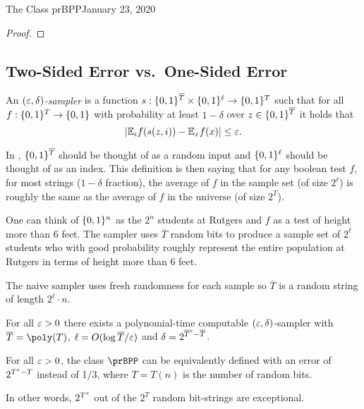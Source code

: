 \begin{lecture}{1}{The Class prBPP}{January 23, 2020}
\begin{proof}
	
\end{proof}

\subsection{Two-Sided Error vs.\ One-Sided Error}


\begin{definition}\label{def:sampler}
  An \emph{$(\varepsilon, \delta)$-sampler} is a function $s :
  \{0,1\}^{\overline{T}} \times \{0,1\}^\ell \to \{0,1\}^T$ such that for
  all $f : \{0,1\}^T \to \{0,1\}$ with probability at least $1 - \delta$ 
  over $z \in \{0,1\}^{\overline{T}}$ it holds that \[
    |\mathbb{E}_i f(s(z, i)) - \mathbb{E}_x f(x)| \le \varepsilon.
  \]
\end{definition}

In , $\{0,1\}^{\overline{T}}$ should be thought of as a random input and $\{0,1\}^\ell$ should be thought of as an index. This definition is then saying that for any boolean test $f$, for most strings ($1-\delta$ fraction), the average of $f$ in the sample set (of size $2^{\ell}$) is roughly the same as the average of $f$ in the universe (of size $2^T$).

One can think of $\{0,1\}^n$ as the $2^n$ students at Rutgers and $f$ as a test of height more than $6$ feet. The sampler uses $\overline{T}$ random bits to produce a sample set of $2^\ell$ students who with good probability roughly represent the entire population at Rutgers in terms of height more than $6$ feet.

The naive sampler uses fresh randomness for each sample so $\overline{T}$ is a random string of length $2^\ell \cdot n$.

\begin{theorem}
  For all $\varepsilon > 0$ there exists a polynomial-time computable $(\varepsilon,
  \delta)$-sampler with $\overline{T} = \poly(T)$, $\ell = O(\log
  \overline{T}/\varepsilon)$ and $\delta = 2^{\overline{T}^\varepsilon - \overline{T}}$.
\end{theorem}

\begin{corollary}\label{cor:bpp-small-random}
  For all $\varepsilon > 0$, the class $\prBPP$ can be equivalently defined with an
  error of $2^{T^\varepsilon - T}$ instead of 1/3, where $T = T(n)$ is the number of
  random bits.

  In other words, $2^{T^\varepsilon}$ out of the $2^T$ random bit-strings are exceptional.
\end{corollary}


\end{lecture}
